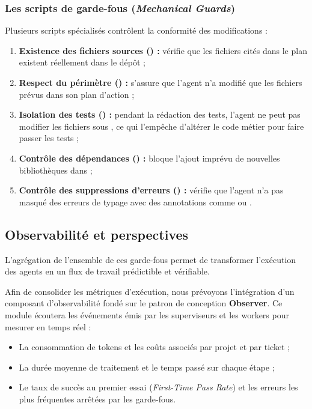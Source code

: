 \documentclass{tnreport}
\begin{document}
\subsubsection{Les scripts de garde-fous (\textit{Mechanical Guards})}
Plusieurs scripts spécialisés contrôlent la conformité des modifications :
\begin{enumerate}
    \item \textbf{Existence des fichiers sources () :} vérifie que les fichiers cités dans le plan existent réellement dans le dépôt ;
    \item \textbf{Respect du périmètre () :} s'assure que l'agent n'a modifié que les fichiers prévus dans son plan d'action ;
    \item \textbf{Isolation des tests () :} pendant la rédaction des tests, l'agent ne peut pas modifier les fichiers sous , ce qui l'empêche d'altérer le code métier pour faire passer les tests ;
    \item \textbf{Contrôle des dépendances () :} bloque l'ajout imprévu de nouvelles bibliothèques dans  ;
    \item \textbf{Contrôle des suppressions d'erreurs () :} vérifie que l'agent n'a pas masqué des erreurs de typage avec des annotations comme  ou .
\end{enumerate}

\subsection{Observabilité et perspectives}
\label{subsec:observabilite_reproductibilite}

L'agrégation de l'ensemble de ces garde-fous permet de transformer l'exécution des agents en un flux de travail prédictible et vérifiable.

Afin de consolider les métriques d'exécution, nous prévoyons l'intégration d'un composant d'observabilité fondé sur le patron de conception \textbf{Observer}. Ce module écoutera les événements émis par les superviseurs et les workers pour mesurer en temps réel :
\begin{itemize}
    \item La consommation de tokens et les coûts associés par projet et par ticket ;
    \item La durée moyenne de traitement et le temps passé sur chaque étape ;
    \item Le taux de succès au premier essai (\textit{First-Time Pass Rate}) et les erreurs les plus fréquentes arrêtées par les garde-fous.
\end{itemize}
\end{document}
